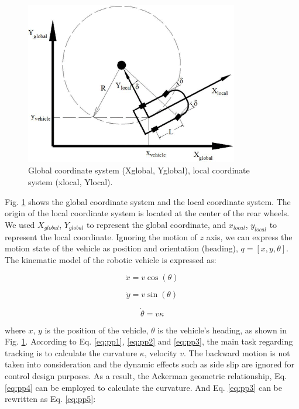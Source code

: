 \begin{figure}[h]
\centering
\includegraphics[height=2.8in]{figs/ch3/purepursuit-cord}
\caption{Global coordinate system (Xglobal, Yglobal), local coordinate system (xlocal, Ylocal).}
\label{fig:purepursuit-cord}
\end{figure}

Fig. \ref{fig:purepursuit-cord} shows the global coordinate system and the local coordinate system. The origin of the local coordinate system is located at the center of the rear wheels. We used $X_{global}$, $Y_{global}$ to represent the global coordinate, and $x_{local}$, $y_{local}$ to represent the local coordinate. Ignoring the motion of $z$ axis, we can express the motion state of the vehicle as position and orientation (heading), $q = [x,y,\theta]$. The kinematic model of the robotic vehicle is expressed as:

\begin{equation} \label{eq:pp1}
\dot{x} = v \cos(\theta)
\end{equation}

\begin{equation} \label{eq:pp2}
\dot{y} = v \sin(\theta)
\end{equation}

\begin{equation} \label{eq:pp3}
\dot{\theta} = v \kappa
\end{equation}

where $x$, $y$ is the position of the vehicle, $\theta$ is the vehicle's heading, as shown in Fig. \ref{fig:purepursuit-cord}. According to Eq. \ref{eq:pp1}, \ref{eq:pp2} and \ref{eq:pp3}, the main task regarding tracking is to calculate the curvature $\kappa$, velocity $v$. The backward motion is not taken into consideration and the dynamic effects such as side slip are ignored for control design purposes. As a result, the Ackerman geometric relationship, Eq. \ref{eq:pp4} can be employed to calculate the curvature. And Eq.  \ref{eq:pp3} can be rewritten as Eq. \ref{eq:pp5}:

